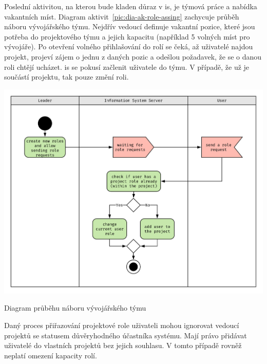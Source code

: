 Poslední aktivitou, na kterou bude kladen důraz v \gls{is}, je týmová práce a nabídka vakantních míst. Diagram aktivit~\ref{pic:dia-ak-role-assing} zachycuje průběh náboru vývojářského týmu. Nejdřív vedoucí definuje vakantní pozice, které jsou potřeba do projektového týmu a jejich kapacitu (například 5 volných míst pro vývojáře). Po otevření volného přihlašování do rolí se čeká, až uživatelé najdou projekt, projeví zájem o jednu z daných pozic a odešlou požadavek, že se o danou roli chtějí ucházet. \gls{is} se pokusí začlenit uživatele do týmu. V případě, že už je součástí projektu, tak pouze změní roli.


\begin{fig:illustration}
   \includegraphics[width=1\textwidth]{images/dia-ak-role-assing.pdf}
   \caption[Diagram průběhu náboru týmu]{Diagram průběhu náboru vývojářského týmu}\label{pic:dia-ak-role-assing}
\end{fig:illustration}


Daný proces přiřazování projektové role uživateli mohou ignorovat vedoucí projektů se statusem důvěryhodného účastníka systému. Mají právo přidávat uživatelé do vlastních projektů bez jejich souhlasu. V tomto případě rovněž neplatí omezení kapacity rolí.
